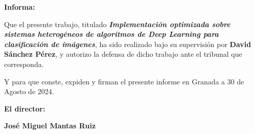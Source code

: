 \vspace{0.5cm}


\textbf{Informa:}

\vspace{0.5cm}

Que el presente trabajo, titulado \textit{\textbf{Implementación optimizada sobre sistemas heterogéneos de algoritmos de Deep Learning para clasificación de imágenes}},
ha sido realizado bajo su supervisión por \textbf{David Sánchez Pérez}, y autorizo la defensa de dicho trabajo ante el tribunal
que corresponda.

\vspace{0.5cm}

Y para que conste, expiden y firman el presente informe en Granada a 30 de Agosto de 2024.

\vspace{1cm}

\textbf{El director:}

\vspace{5cm}

\noindent \textbf{José Miguel Mantas Ruiz}


